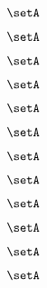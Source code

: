 \begin{forslides}
    \begin{equation}
        \label{eq:slides-translation-29}
        \setA
    \end{equation}
    
    \begin{equation}
        \label{eq:slides-translation-30}
        \setA
    \end{equation}

    \begin{equation}
        \label{eq:slides-translation-31}
        \setA
    \end{equation}

    \begin{equation}
        \label{eq:slides-translation-32}
        \setA
    \end{equation}

    \begin{equation}
        \label{eq:slides-translation-33}
        \setA
    \end{equation}

    \begin{equation}
        \label{eq:slides-translation-34}
        \setA
    \end{equation}

    \begin{equation}
        \label{eq:slides-translation-35}
        \setA
    \end{equation}

    \begin{equation}
        \label{eq:slides-translation-36}
        \setA
    \end{equation}

    \begin{equation}
        \label{eq:slides-translation-37}
        \setA
    \end{equation}

    \begin{equation}
        \label{eq:slides-translation-38}
        \setA
    \end{equation}

    \begin{equation}
        \label{eq:slides-translation-39}
        \setA
    \end{equation}
    
    \begin{equation}
        \label{eq:slides-translation-40}
        \setA
    \end{equation}


\end{forslides}
